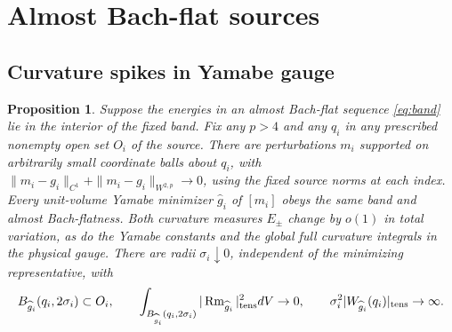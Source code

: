 \documentclass[11pt]{article}
\numberwithin{equation}{section}
\newtheorem{proposition}[theorem]{Proposition}
\theoremstyle{definition}
\theoremstyle{remark}
\newcommand{\Rm}{\operatorname{Rm}}
\begin{document}





\section{Almost Bach-flat sources}

\subsection{Curvature spikes in Yamabe gauge}

\begin{proposition}\label{prop:spikes}
Suppose the energies in an almost Bach-flat sequence
\eqref{eq:band} lie in the interior of the fixed band.
Fix any \(p>4\) and any \(q_i\) in any prescribed
nonempty open set \(O_i\) of the source. There are
perturbations \(m_i\) supported on arbitrarily small
coordinate balls about \(q_i\), with
\(\|m_i-g_i\|_{C^1}+\|m_i-g_i\|_{W^{2,p}}\to0\), using
the fixed source norms at each index. Every unit-volume
Yamabe minimizer \(\widehat g_i\) of \([m_i]\) obeys
the same band and almost Bach-flatness. Both curvature
measures \(E_\pm\) change by \(o(1)\) in total variation,
as do the Yamabe constants and the global full curvature
integrals in the physical gauge. There are radii \(\sigma_i\downarrow0\),
independent of the minimizing representative, with
\[
 B_{\widehat g_i}(q_i,2\sigma_i)\subset O_i,\qquad
 \int_{B_{\widehat g_i}(q_i,2\sigma_i)}
      |\Rm_{\widehat g_i}|^2_{\rm tens}dV\to0,\qquad
 \sigma_i^2|W_{\widehat g_i}(q_i)|_{\rm tens}\to\infty .
\]
\end{proposition}
\end{document}

